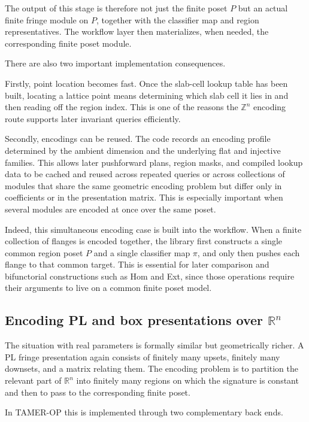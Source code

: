 \documentclass[11pt]{article}
\newcommand{\R}{\mathbb{R}}
\newcommand{\Z}{\mathbb{Z}}
\newcommand{\TAMER}{\textsc{TAMER-OP}}
\theoremstyle{definition}
\theoremstyle{remark}
\begin{document}
The output of this stage is therefore not just the finite poset $P$ but an actual finite fringe module on $P$, together with the classifier map and region representatives.  The workflow layer then materializes, when needed, the corresponding finite poset module.

There are also two important implementation consequences.

Firstly, point location becomes fast.  Once the slab-cell lookup table has been built, locating a lattice point means determining which slab cell it lies in and then reading off the region index.  This is one of the reasons the $\Z^n$ encoding route supports later invariant queries efficiently.

Secondly, encodings can be reused.  The code records an encoding profile determined by the ambient dimension and the underlying flat and injective families.  This allows later pushforward plans, region masks, and compiled lookup data to be cached and reused across repeated queries or across collections of modules that share the same geometric encoding problem but differ only in coefficients or in the presentation matrix.  This is especially important when several modules are encoded at once over the same poset.

Indeed, this simultaneous encoding case is built into the workflow.  When a finite collection of flanges is encoded together, the library first constructs a single common region poset $P$ and a single classifier map $\pi$, and only then pushes each flange to that common target.  This is essential for later comparison and bifunctorial constructions such as Hom and Ext, since those operations require their arguments to live on a common finite poset model.

\subsection{Encoding PL and box presentations over $\mathbb{R}^n$}
\label{subsec:encoding-rn}

The situation with real parameters is formally similar but geometrically richer.  A PL fringe presentation again consists of finitely many upsets, finitely many downsets, and a matrix relating them.  The encoding problem is to partition the relevant part of $\R^n$ into finitely many regions on which the signature is constant and then to pass to the corresponding finite poset.

In \TAMER{} this is implemented through two complementary back ends.
\end{document}
